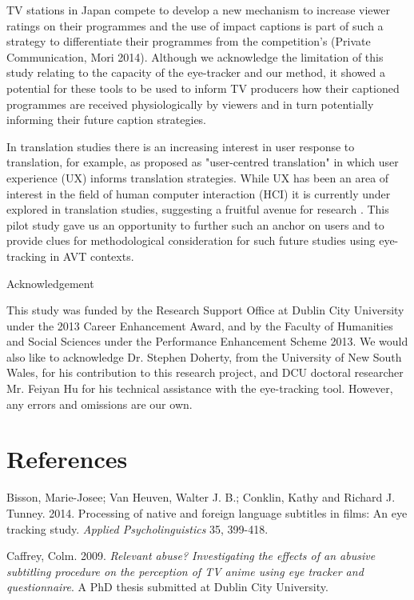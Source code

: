 \documentclass[output=paper]{langsci/langscibook}
\begin{document}
TV stations in Japan compete to develop a new mechanism to increase viewer ratings on their programmes and the use of impact captions is part of such a strategy to differentiate their programmes from the competition's (Private Communication, Mori 2014). Although we acknowledge the limitation of this study relating to the capacity of the eye-tracker and our method, it showed a potential for these tools to be used to inform TV producers how their captioned programmes are received physiologically by viewers and in turn potentially informing their future caption strategies.  



In translation studies there is an increasing interest in user response to translation, for example, as proposed as "user-centred translation" \citep{Suojanen2015} in which user experience (UX) informs translation strategies. While UX has been an area of interest in the field of human computer interaction (HCI) it is currently under explored in translation studies, suggesting a fruitful avenue for research \citep[pp. 312--318]{ohagan2013}. This pilot study gave us an opportunity to further such an anchor on users and to provide clues for methodological consideration for such future studies using eye-tracking in AVT contexts. 


Acknowledgement

This study was funded by the Research Support Office at Dublin City University under the 2013 Career Enhancement Award, and by the Faculty of Humanities and Social Sciences under the Performance Enhancement Scheme 2013. We would also like to acknowledge Dr. Stephen Doherty, from the University of New South Wales, for his contribution to this research project, and DCU doctoral researcher Mr. Feiyan Hu for his technical assistance with the eye-tracking tool. However, any errors and omissions are our own. 

\section{References}


Bisson, Marie-Josee; Van Heuven, Walter J. B.; Conklin, Kathy and Richard J. Tunney. 2014. Processing of native and foreign language subtitles in films: An eye tracking study. \textit{Applied Psycholinguistics} 35, 399-418.



Caffrey, Colm. 2009. \textit{Relevant abuse? Investigating the effects of an abusive subtitling procedure on the perception of TV anime using eye tracker and questionnaire}. A PhD thesis submitted at Dublin City University. 
\end{document}

